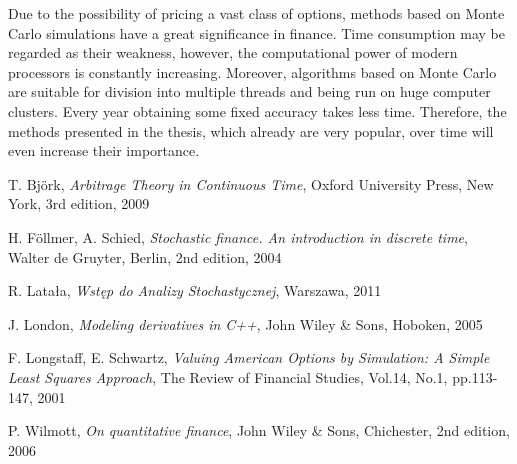 \documentclass[a4paper,11pt, twoside]{book}
\theoremstyle{definition}
\theoremstyle{remark}
\begin{document}
Due to the possibility of pricing a vast class of options, methods based on Monte Carlo simulations have a great significance in finance. Time consumption may be regarded as their weakness, however, the computational power of modern processors is constantly increasing. Moreover, algorithms based on Monte Carlo are suitable for division into multiple threads and being run on huge computer clusters. Every year obtaining some fixed accuracy takes less time. Therefore, the methods presented in the thesis, which already are very popular, over time will even increase their importance.

\begin{thebibliography}{99}

T. Bj\"{o}rk, \emph{Arbitrage Theory in Continuous Time}, Oxford University Press,  New York, 3rd edition, 2009

H. F\"{o}llmer, A. Schied, \emph{Stochastic finance. An introduction in discrete time}, Walter de Gruyter, Berlin, 2nd edition, 2004

R. Latała, \emph{Wstęp do Analizy Stochastycznej}, Warszawa, 2011

J. London, \emph{Modeling derivatives in C++}, John Wiley \& Sons, Hoboken, 2005

F. Longstaff, E. Schwartz, \emph{Valuing American Options by Simulation: A Simple Least Squares Approach}, The Review of Financial Studies, Vol.14, No.1, pp.113-147, 2001

P. Wilmott, \emph{On quantitative finance}, John Wiley \& Sons, Chichester, 2nd edition, 2006

\end{thebibliography}
\end{document}
